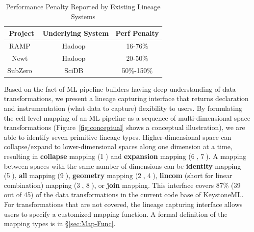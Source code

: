 \documentclass{sig-alternate}
\begin{document}
\begin{table}[t]
\begin{center}
    \caption{Performance Penalty Reported by Existing Lineage Systems}
    \begin{scriptsize}
    \begin{tabular}{ | c | c | c |}
    \hline
    Project & Underlying System & Perf Penalty  \\ \hline \hline
    RAMP~\cite{ikeda11} & Hadoop~\cite{HADOOP} & 16-76\% \\ \hline
    Newt~\cite{logothetis13} & Hadoop~\cite{HADOOP} & 20-50\% \\ \hline
    SubZero~\cite{wu13} & SciDB~\cite{brown10} & 50\%-150\% \\ \hline
    \end{tabular}
    \end{scriptsize}
    \label{tb:overhead}
\end{center}   
\end{table}

Based on the fact of ML pipeline builders having deep understanding of data transformations,  
we present a lineage capturing interface that returns declaration and instrumentation (what data to capture) flexibility to users. 
By formulating the cell level mapping of an ML pipeline as a sequence of multi-dimensional space transformations
(Figure~\ref{fig:conceptual} shows a conceptual illustration), we are able to identify seven primitive lineage types.
Higher-dimensional space can collapse/expand to lower-dimensional spaces along one dimension at a time, 
resulting in {\bf collapse} mapping (\textcircled{1}) and {\bf expansion} mapping (\textcircled{6}, \textcircled{7}). 
A mapping between spaces with the same number of dimensions can be {\bf identity} mapping (\textcircled{5}), {\bf all} mapping (\textcircled{9}), 
{\bf geometry} mapping (\textcircled{2}, \textcircled{4}), {\bf lincom} (short for linear combination) mapping (\textcircled{3}, \textcircled{8}),
or {\bf join} mapping. 
This interface covers 87\% (39 out of 45) of the data transformations in the current code base of KeystoneML. 
For transformations that are not covered, the lineage capturing interface allows users to specify a customized mapping function.
A formal definition of the mapping types is in \S\ref{sec:Map-Func}.
\end{document}
